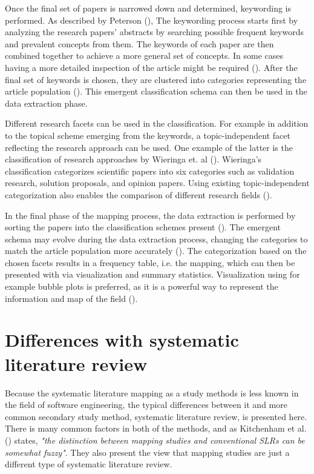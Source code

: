 Once the final set of papers is narrowed down and determined, keywording is
performed. As described by Peterson (\cite*{petersen2008}), The keywording
process starts first by analyzing the research papers' abstracts by searching
possible frequent keywords and prevalent concepts from them. The keywords of
each paper are then combined together to achieve a more general set of concepts.
In some cases having a more detailed inspection of the article might be required
(\cite{petersen2008,petersen2015}). After the final set of keywords is chosen,
they are clustered into categories representing the article population
(\cite{petersen2008}). This emergent classification schema can then be used in
the data extraction phase.

Different research facets can be used in the classification. For example in
addition to the topical scheme emerging from the keywords, a topic-independent
facet reflecting the research approach can be used. One example of the latter is
the classification of research approaches by Wieringa et. al
(\cite*{wieringa2006}). Wieringa's classification categorizes scientific papers
into six categories such as validation research, solution proposals, and opinion
papers. Using existing topic-independent categorization also enables the
comparison of  different research fields (\cite{petersen2015}).

In the final phase of the mapping process, the data extraction is performed by
sorting the papers into the classification schemes present
(\cite{petersen2008}). The emergent schema may evolve during the data extraction
process, changing the categories to match the article population more accurately
(\cite{petersen2015}). The categorization based on the chosen facets results in
a frequency table, i.e. the mapping, which can then be presented with via
visualization and summary statistics. Visualization using for example bubble
plots is preferred, as it is a powerful way to represent the information and map
of the field (\cite{petersen2008}).


\section{Differences with systematic literature review}

Because the systematic literature mapping as a study methods is less known in
the field of software engineering, the typical differences between it and more
common secondary study method, systematic literature review, is presented here.
There is many common factors in both of the methods, and as Kitchenham et al.
(\cite*{kitchenham2010}) states, \textit{"the distinction between mapping studies
and conventional SLRs can be somewhat fuzzy"}. They also present the view that
mapping studies are just a different type of systematic literature review.

